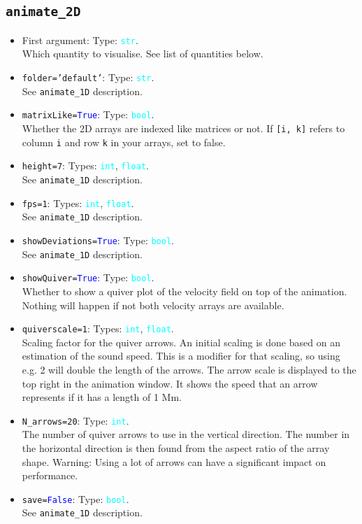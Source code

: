 \documentclass{article}
\newcommand{\ttt}[1]{\texttt{#1}}
\newcommand{\ptype}[1]{\texttt{\textcolor{cyan}{#1}}}
\newcommand{\cbl}[1]{\textcolor{blue}{#1}}
\newcommand{\cro}[1]{\textcolor{RedOrange}{#1}}
\newcommand{\cyo}[1]{\textcolor{YellowOrange}{#1}}
\begin{document}
\subsection{\ttt{animate\_2D}}
\label{sec:anim2}
\begin{itemize}
	\item First argument: Type: \ptype{str}.\\Which quantity to visualise. See list of quantities below.
	\item \ttt{\cro{folder}=\cyo{'default'}}: Type: \ptype{str}.\\See \ttt{animate\_1D} description.
	\item \ttt{\cro{matrixLike}=\cbl{True}}: Type: \ptype{bool}.\\Whether the 2D arrays are indexed like matrices or not. If \ttt{[i, k]} refers to column \ttt{i} and row \ttt{k} in your arrays, set to false.
	\item \ttt{\cro{height}=7}: Types: \ptype{int}, \ptype{float}.\\See \ttt{animate\_1D} description.
	\item \ttt{\cro{fps}=1}: Types: \ptype{int}, \ptype{float}.\\See \ttt{animate\_1D} description.
	\item \ttt{\cro{showDeviations}=\cbl{True}}: Type: \ptype{bool}.\\See \ttt{animate\_1D} description.
	\item \ttt{\cro{showQuiver}=\cbl{True}}: Type: \ptype{bool}.\\Whether to show a quiver plot of the velocity field on top of the animation. Nothing will happen if not both velocity arrays are available.
	\item \ttt{\cro{quiverscale}=1}: Types: \ptype{int}, \ptype{float}.\\Scaling factor for the quiver arrows. An initial scaling is done based on an estimation of the sound speed. This is a modifier for that scaling, so using e.g. 2 will double the length of the arrows. The arrow scale is displayed to the top right in the animation window. It shows the speed that an arrow represents if it has a length of 1 Mm.
	\item \ttt{\cro{N\_arrows}=20}: Type: \ptype{int}.\\The number of quiver arrows to use in the vertical direction. The number in the horizontal direction is then found from the aspect ratio of the array shape. Warning: Using a lot of arrows can have a significant impact on performance.
	\item \ttt{\cro{save}=\cbl{False}}: Type: \ptype{bool}.\\See \ttt{animate\_1D} description.

\end{itemize}
\end{document}
